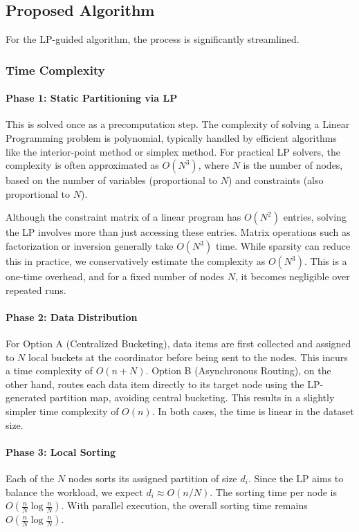 \documentclass[]{interact}
\theoremstyle{plain}
\theoremstyle{definition}
\theoremstyle{remark}
\begin{document}
\subsection{Proposed Algorithm}
For the LP-guided algorithm, the process is significantly streamlined.

\subsubsection{Time Complexity}

\paragraph{Phase 1: Static Partitioning via LP}
This is solved once as a precomputation step. The complexity of solving a Linear Programming problem is polynomial, typically handled by efficient algorithms like the interior-point method or simplex method. For practical LP solvers, the complexity is often approximated as $O(N^3)$, where $N$ is the number of nodes, based on the number of variables (proportional to $N$) and constraints (also proportional to $N$). 

Although the constraint matrix of a linear program has \(O(N^2)\) entries, solving the LP involves more than just accessing these entries. Matrix operations such as factorization or inversion generally take \(O(N^3)\) time. While sparsity can reduce this in practice, we conservatively estimate the complexity as $O(N^3)$. This is a one-time overhead, and for a fixed number of nodes $N$, it becomes negligible over repeated runs.

\paragraph{Phase 2: Data Distribution}
For Option A (Centralized Bucketing), data items are first collected and assigned to $N$ local buckets at the coordinator before being sent to the nodes. This incurs a time complexity of $O(n + N)$. Option B (Asynchronous Routing), on the other hand, routes each data item directly to its target node using the LP-generated partition map, avoiding central bucketing. This results in a slightly simpler time complexity of $O(n)$. In both cases, the time is linear in the dataset size.

\paragraph{Phase 3: Local Sorting}
Each of the $N$ nodes sorts its assigned partition of size $d_i$. Since the LP aims to balance the workload, we expect $d_i \approx O(n/N)$. The sorting time per node is $O\left(\frac{n}{N} \log \frac{n}{N}\right)$. With parallel execution, the overall sorting time remains $O\left(\frac{n}{N} \log \frac{n}{N}\right)$.
\end{document}
